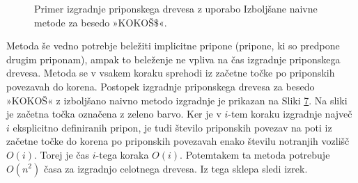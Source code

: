 \begin{figure}[htb]
\begin{subfigure}[t]{0.3\linewidth}
    \subcaption*{}
        
        \centering
        \label{fig:IzbolšanaNaivna1}
    \end{subfigure}
    \hspace{0.5cm}
    \begin{subfigure}[t]{0.3\linewidth}
        \subcaption*{}
        
        \centering
        \label{fig:IzbolšanaNaivna2}
    \end{subfigure}
    \hspace{0.5cm}
    \begin{subfigure}[t]{0.3\linewidth}
        \subcaption*{}
        
        \centering
        \label{fig:IzbolšanaNaivna3}
    \end{subfigure}
    
    \begin{subfigure}[t]{0.3\linewidth}
        \subcaption*{}
        
        \centering
        \label{fig:IzbolšanaNaivna4}
    \end{subfigure}
    \hspace{0.5cm}
    \begin{subfigure}[t]{0.3\linewidth}
        \subcaption*{}
        
        \centering
        \label{fig:IzbolšanaNaivna5}
    \end{subfigure}
    \hspace{0.5cm}
    \begin{subfigure}[t]{0.3\textwidth}
        \subcaption*{}
        
        \centering
        \label{fig:IzbolšanaNaivna6}
    \end{subfigure}

       \caption{Primer izgradnje priponskega drevesa z uporabo Izboljšane naivne metode za besedo »KOKOŠ$\$$«.} 
        \label{fig:IzbolšanaNaivna}
\end{figure}

Metoda še vedno potrebje beležiti implicitne pripone (pripone, ki so predpone drugim priponam), ampak to beleženje ne vpliva na čas izgradnje priponskega drevesa. Metoda se v vsakem koraku sprehodi iz začetne točke po priponskih povezavah do korena. Postopek izgradnje priponskega drevesa za besedo »KOKOŠ« z izboljšano naivno metodo izgradnje je prikazan na Sliki \ref{fig:IzbolšanaNaivna}. Na sliki je začetna točka označena z zeleno barvo. Ker je v $i$-tem koraku izgradnje največ $i$ eksplicitno definiranih pripon, je tudi število priponskih povezav na poti iz začetne točke do korena po priponskih povezavah enako številu notranjih vozlišč $O(i)$. Torej je čas $i$-tega koraka $O(i)$. Potemtakem ta metoda potrebuje $O(n^2)$ časa za izgradnjo celotnega drevesa. Iz tega sklepa sledi izrek.

